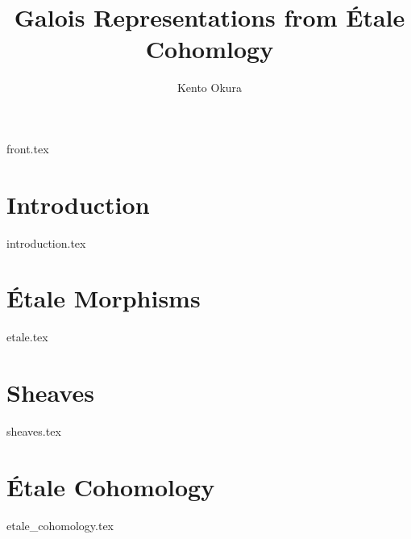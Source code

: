 \documentclass[11pt, openany]{memoir}
\title{Galois Representations from \'Etale Cohomlogy}
\author{Kento Okura}
\begin{document}
  \frontmatter
  {front.tex}

  \mainmatter
  \chapter{Introduction}
  {introduction.tex}

  \chapter{\'Etale Morphisms}
  {etale.tex}

  \chapter{Sheaves}
  {sheaves.tex}

  \chapter{\'Etale Cohomology}
  {etale_cohomology.tex}

  
  
\end{document}
